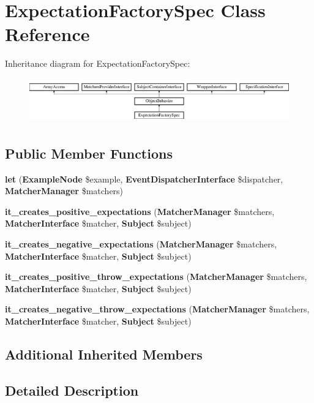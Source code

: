 \section{Expectation\+Factory\+Spec Class Reference}
\label{classspec_1_1_php_spec_1_1_wrapper_1_1_subject_1_1_expectation_factory_spec}
Inheritance diagram for Expectation\+Factory\+Spec\+:\begin{figure}[H]
\begin{center}
\leavevmode
\includegraphics[height=1.953488cm]{classspec_1_1_php_spec_1_1_wrapper_1_1_subject_1_1_expectation_factory_spec}
\end{center}
\end{figure}
\subsection*{Public Member Functions}
\begin{DoxyCompactItemize}
\item 
{\bf let} ({\bf Example\+Node} \$example, {\bf Event\+Dispatcher\+Interface} \$dispatcher, {\bf Matcher\+Manager} \$matchers)
\item 
{\bf it\+\_\+creates\+\_\+positive\+\_\+expectations} ({\bf Matcher\+Manager} \$matchers, {\bf Matcher\+Interface} \$matcher, {\bf Subject} \$subject)
\item 
{\bf it\+\_\+creates\+\_\+negative\+\_\+expectations} ({\bf Matcher\+Manager} \$matchers, {\bf Matcher\+Interface} \$matcher, {\bf Subject} \$subject)
\item 
{\bf it\+\_\+creates\+\_\+positive\+\_\+throw\+\_\+expectations} ({\bf Matcher\+Manager} \$matchers, {\bf Matcher\+Interface} \$matcher, {\bf Subject} \$subject)
\item 
{\bf it\+\_\+creates\+\_\+negative\+\_\+throw\+\_\+expectations} ({\bf Matcher\+Manager} \$matchers, {\bf Matcher\+Interface} \$matcher, {\bf Subject} \$subject)
\end{DoxyCompactItemize}
\subsection*{Additional Inherited Members}


\subsection{Detailed Description}


